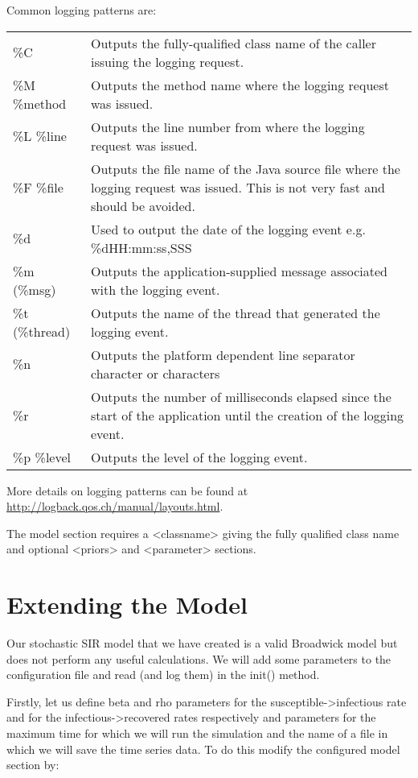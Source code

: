 Common logging patterns are:

\begin{tabulary}{1.0\textwidth}{l p{10cm}}
\toprule
\%C             & Outputs the fully-qualified class name of the caller issuing the logging request. \\
\%M  {\%method} & Outputs the method name where the logging request was issued. \\
\%L  {\%line}   & Outputs the line number from where the logging request was issued. \\
\%F  {\%file}   & Outputs the file name of the Java source file where the logging request was issued. This is not very fast and should be avoided. \\
\%d & Used to output the date of the logging event e.g. \%d{HH:mm:ss,SSS}  \\
\%m  (\%msg)    & Outputs the application-supplied message associated with the logging event. \\
\%t  (\%thread) & Outputs the name of the thread that generated the logging event. \\
\%n & Outputs the platform dependent line separator character or characters \\
\%r & Outputs the number of milliseconds elapsed since the start of the application until the creation of the logging event. \\
\%p  {\%level}  & Outputs the level of the logging event. \\
\bottomrule
\end{tabulary}


More details on logging patterns can be found at \url{http://logback.qos.ch/manual/layouts.html}.

The model section requires a <classname> giving the fully qualified class name and optional <priors> and <parameter> sections. 

\section{Extending the Model}

Our stochastic SIR model that we have created is a valid Broadwick model but does not perform any useful calculations. We will add some parameters to the configuration file and read (and log them) in the init() method.

Firstly, let us define beta and rho parameters for the susceptible->infectious rate and for the infectious->recovered rates respectively and parameters for the maximum time for which we will run the simulation and the name of a file in which we will save the time series data. To do this modify the configured model section by:

